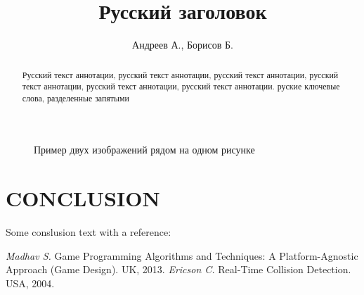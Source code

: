 \documentclass[intlimits,twoside,a4paper,11pt]{article}
\begin{document}
\begin{figure}[H]
\begin{subfigure}[t]{50mm}
		\subcaption{} %
		\label{fig-example-2b}
	\end{subfigure}
	\caption{Пример двух изображений рядом на одном рисунке} \label{fig-example-2}
\end{figure}

\section{CONCLUSION}
Some conslusion text with a reference:~\cite{lib-1,lib-2}

\begin{thebibliography}{9}
 {\it Madhav S.} Game Programming Algorithms and Techniques: A Platform-Agnostic Approach (Game Design). UK, 2013. 
 {\it Ericson C.} Real-Time Collision Detection. USA, 2004.
\end{thebibliography}

\translatedpart

\title{Русский заголовок}
\author{Андреев А., Борисов Б.}

\maketranslatedtitle

\begin{abstract}
Русский текст аннотации, русский текст аннотации, русский текст аннотации, русский текст аннотации, русский текст аннотации, русский текст аннотации.
\keywords руские ключевые слова, разделенные запятыми
\end{abstract}

\makekioauthors
\end{document}
